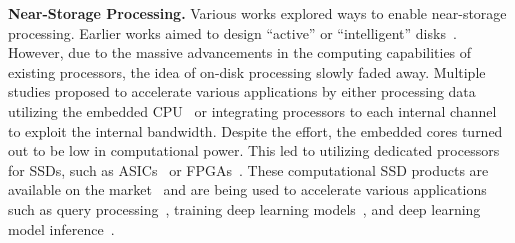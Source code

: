 \textbf{Near-Storage Processing.} 
Various works explored ways to enable near-storage processing.
Earlier works aimed to design ``active'' or ``intelligent'' disks~\cite{active_disk, active_disk_large, active_storage_large, idisk}. 
However, due to the massive advancements in the computing capabilities of existing processors, the idea of on-disk processing slowly faded away.
Multiple studies proposed to accelerate various applications by either processing data utilizing the embedded CPU~\cite{self_sorting_ssd, earlysmartssd} or integrating processors to each internal channel~\cite{smartssd_datamine, biscuit} to exploit the internal bandwidth.
Despite the effort, the embedded cores turned out to be low in computational power.
This led to utilizing dedicated processors for SSDs, such as ASICs~\cite{genstore, deepstore, inspire} or FPGAs~\cite{netezza, exadata, rmssd, secndp}.
These computational SSD products are available on the market~\cite{smartssd} and are being used to accelerate various applications such as query processing~\cite{smartssd_query}, training deep learning models~\cite{smartsage, smartinfinity}, and deep learning model inference~\cite{smartssd_dlrm}.